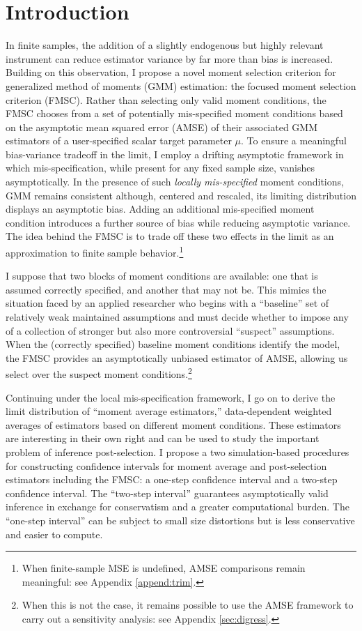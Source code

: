 \section{Introduction}
In finite samples, the addition of a slightly endogenous but highly relevant instrument can reduce estimator variance by far more than bias is increased. 
Building on this observation, I propose a novel moment selection criterion for generalized method of moments (GMM) estimation: the focused moment selection criterion (FMSC). 
Rather than selecting only valid moment conditions, the FMSC chooses from a set of potentially mis-specified moment conditions based on the asymptotic mean squared error (AMSE) of their associated GMM estimators of a user-specified scalar target parameter $\mu$.
To ensure a meaningful bias-variance tradeoff in the limit, I employ a drifting asymptotic framework in which mis-specification, while present for any fixed sample size, vanishes asymptotically.
In the presence of such \emph{locally mis-specified} moment conditions, GMM remains consistent although, centered and rescaled, its limiting distribution displays an asymptotic bias. Adding an additional mis-specified moment condition introduces a further source of bias while reducing asymptotic variance. 
The idea behind the FMSC is to trade off these two effects in the limit as an approximation to finite sample behavior.\footnote{When finite-sample MSE is undefined, AMSE comparisons remain meaningful: see Appendix \ref{append:trim}.}

 
I suppose that two blocks of moment conditions are available: one that is assumed correctly specified, and another that may not be.
This mimics the situation faced by an applied researcher who begins with a ``baseline'' set of relatively weak maintained assumptions and must decide whether to impose any of a collection of stronger but also more controversial ``suspect'' assumptions.
When the (correctly specified) baseline moment conditions identify the model, the FMSC provides an asymptotically unbiased estimator of AMSE, allowing us select over the suspect moment conditions.\footnote{When this is not the case, it remains possible to use the AMSE framework to carry out a sensitivity analysis: see Appendix \ref{sec:digress}.}

Continuing under the local mis-specification framework, I go on to derive the limit distribution of ``moment average estimators,'' data-dependent weighted averages of estimators based on different moment conditions.
These estimators are interesting in their own right and can be used to study the important problem of inference post-selection.
I propose a two simulation-based procedures for constructing confidence intervals for moment average and post-selection estimators including the FMSC: a one-step confidence interval and a two-step confidence interval.
The ``two-step interval'' guarantees asymptotically valid inference in exchange for conservatism and a greater computational burden.
The ``one-step interval'' can be subject to small size distortions but is less conservative and easier to compute.


